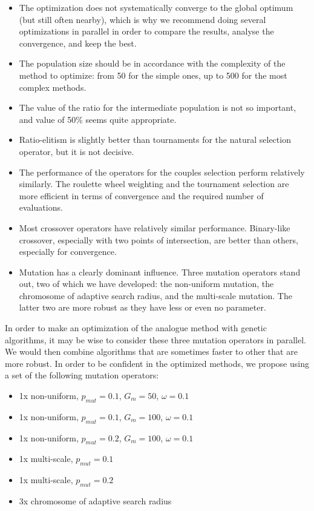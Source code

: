 \documentclass[twocol]{ametsoc}
\begin{document}
\begin{itemize}
	\item The optimization does not systematically converge to the global optimum  (but still often nearby), which is why we recommend doing several optimizations in parallel in order to compare the results, analyse the convergence, and keep the best.
	
	\item The population size should be in accordance with the complexity of the method to optimize: from 50 for the simple ones, up to 500 for the most complex methods.
	
	\item The value of the ratio for the intermediate population is not so important, and value of 50\% seems quite appropriate.
	
	\item Ratio-elitism is slightly better than tournaments for the natural selection operator, but it is not decisive.
	
	\item The performance of the operators for the couples selection perform relatively similarly. The roulette wheel weighting and the tournament selection are more efficient in terms of convergence and the required number of evaluations.
	
	\item Most crossover operators have relatively similar performance. Binary-like crossover, especially with two points of intersection, are better than others, especially for convergence.
	 
	\item Mutation has a clearly dominant influence. Three mutation operators stand out, two of which we have developed: the non-uniform mutation, the chromosome of adaptive search radius, and the multi-scale mutation. The latter two are more robust as they have less or even no parameter.
	 
\end{itemize}

In order to make an optimization of the analogue method with genetic algorithms, it may be wise to consider these three mutation operators in parallel. We would then combine algorithms that are sometimes faster to other that are more robust. In order to be confident in the optimized methods, we propose using a set of the following mutation operators:

\begin{itemize}
	\setlength\itemsep{-4px}
	\item 1x non-uniform, $p_{mut}=0.1$, $G_{m}=50$, $\omega=0.1$
	\item 1x non-uniform, $p_{mut}=0.1$, $G_{m}=100$, $\omega=0.1$
	\item 1x non-uniform, $p_{mut}=0.2$, $G_{m}=100$, $\omega=0.1$
	\item 1x multi-scale,  $p_{mut}=0.1$
	\item 1x multi-scale,  $p_{mut}=0.2$
	\item 3x chromosome of adaptive search radius
\end{itemize}
\end{document}
